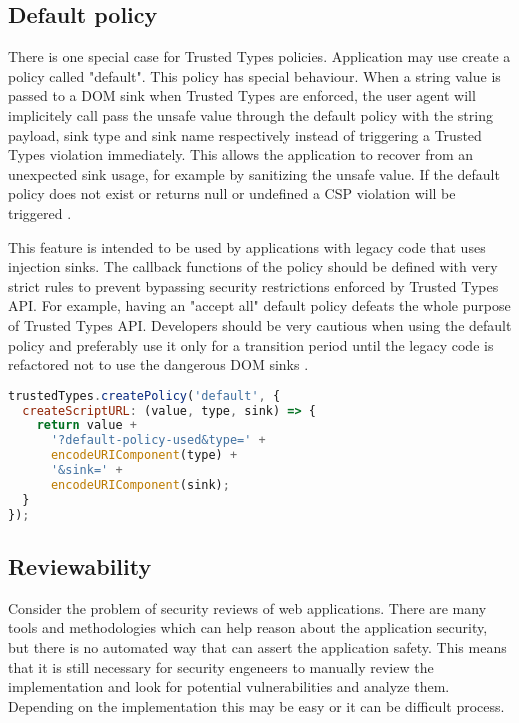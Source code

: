 \subsection{Default policy}

There is one special case for Trusted Types policies. Application may use create a policy called
"default". This policy has special behaviour. When a string value is passed to a DOM sink when
Trusted Types are enforced, the user agent will implicitely call pass the unsafe value through the
default policy with the string payload, sink type and sink name respectively instead of triggering a
Trusted Types violation immediately. This allows the application to recover from an unexpected sink
usage, for example by sanitizing the unsafe value. If the default policy does not exist or returns
null or undefined a CSP violation will be triggered \cite{tt_spec:default_policy}.

This feature is intended to be used by applications with legacy code that uses injection sinks. The
callback functions of the policy should be defined with very strict rules to prevent bypassing
security restrictions enforced by Trusted Types API. For example, having an "accept all" default
policy defeats the whole purpose of Trusted Types API. Developers should be very cautious when using
the default policy and preferably use it only for a transition period until the legacy code is
refactored not to use the dangerous DOM sinks \cite{tt_spec:default_policy}.

\bigskip
\begin{lstlisting}[language=JavaScript, caption=Creating a default policy \cite{tt_spec:default_policy}]
trustedTypes.createPolicy('default', {
  createScriptURL: (value, type, sink) => {
    return value +
      '?default-policy-used&type=' +
      encodeURIComponent(type) +
      '&sink=' +
      encodeURIComponent(sink);
  }
});
\end{lstlisting}

\subsection{Reviewability}

Consider the problem of security reviews of web applications. There are many tools and methodologies
which can help reason about the application security, but there is no automated way that can assert
the application safety. This means that it is still necessary for security engeneers to manually
review the implementation and look for potential vulnerabilities and analyze them. Depending on the
implementation this may be easy or it can be difficult process.

